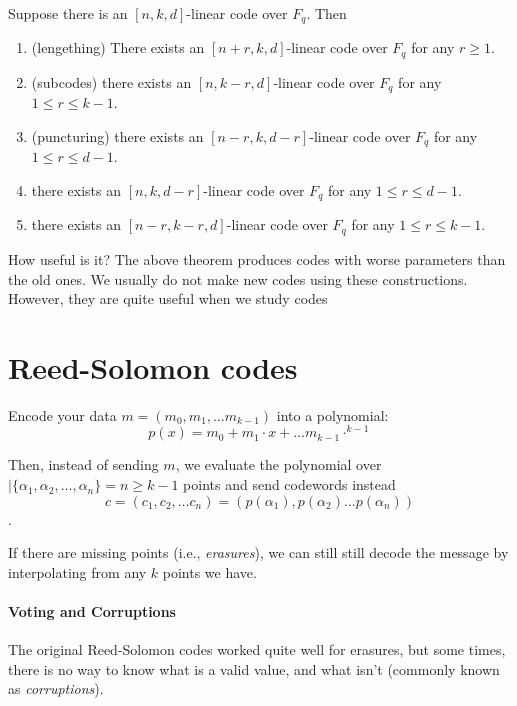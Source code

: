 \begin{theorem}
    Suppose there is an $[n, k, d]$-linear code over $F_q$. Then
    \begin{enumerate}
        \item (lengething) There exists an $[n + r, k, d]$-linear code over 
        $F_q$ for any $r \ge 1$.

        \item (subcodes) there exists an $[n, k-r, d]$-linear code over $F_q$ for any 
        $1 \le r \le k- 1$.

        \item (puncturing) there exists an $[n- r, k, d- r]$-linear code over $F_q$ for any
        $1 \le r \le d- 1$.

        \item there exists an $[n, k, d- r]$-linear code over
         $F_q$ for any $1 \le r \le d- 1$.
        
        \item there exists an $[n- r, k- r, d]$-linear code over
         $F_q$ for any $1 \le r \le k- 1$.
    \end{enumerate}
\end{theorem}

\begin{bclogo}[couleur=blue!10, arrondi=0.1, logo=\bcinfo]{How useful is it?}
The above theorem produces codes with worse
parameters than the old ones. We usually do not make new codes using these
constructions. However, they are quite useful when we study codes
\end{bclogo}


\section{Reed-Solomon codes}

Encode your data $m=(m_0, m_1 ,\dots m_{k-1})$ into a polynomial:
$$ p(x)=m_0 +m_1 \cdot x + \dots  m_{k-1}\cdot ^{k-1}$$

Then, instead of sending $m$, we evaluate the polynomial 
over $|\{\alpha_1,\alpha_2,\dots,\alpha_n\}=n\ge k-1$ 
points and send codewords instead
$$c=(c_1,c_2,\dots c_n) =(p(\alpha_1), p(\alpha_2)\dots p(\alpha_n))$$.

If there are missing points (i.e., \emph{erasures}),
we can still still decode the message by interpolating 
from any $k$ points we have.


\paragraph{Voting and Corruptions}
    The original Reed-Solomon codes worked quite well for erasures,
    but some times, there is no way to know what is a valid 
    value, and what isn't (commonly known as \emph{corruptions}).

